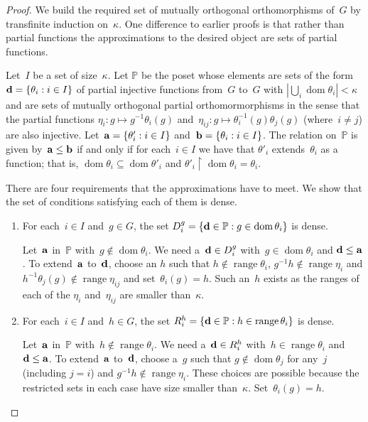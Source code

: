 \documentclass[12pt,a4paper]{article}
\DeclareMathOperator{\dom}{dom}
\DeclareMathOperator{\ran}{range}
\newcommand{\rest}{\mathbin{\upharpoonright}}
\renewcommand{\P}{\mathbb{P}}
\renewcommand{\a}{\textup{\textbf{a}}}
\renewcommand{\b}{\textup{\textbf{b}}}
\renewcommand{\d}{\textup{\textbf{d}}}
\begin{document}
\begin{proof}
We build the required set of mutually orthogonal orthomorphisms of~$G$ by transfinite induction on~$\kappa$.  One difference to earlier proofs is that rather than partial functions the approximations to the desired object are sets of partial functions.

Let~$I$ be a set of size~$\kappa$.  Let $\P$ be the poset whose elements are sets of the form~$\d=\{ \theta_i : i \in I \}$ of partial injective functions from~$G$ to~$G$ with $|\bigcup_{i} \dom \theta_i|  < \kappa$ and are sets of mutually orthogonal partial orthomormorphisms in the sense that the partial functions $\eta_i: g \mapsto g^{-1}\theta_i(g)$ and~$\eta_{ij}: g \mapsto \theta_i^{-1}(g)\theta_j(g)$ (where~$i \neq j$) are also injective.  Let~$\a = \{ \theta'_i : i \in I \}$ and~$\b = \{ \theta_i : i \in I \}$.
The relation on~$\P$ is given by~$\a \leq \b$ if and only if for each~$i \in I$ we have that $\theta'_i$ extends~$\theta_i$ as a function;  that is,  $\dom \theta_i \subseteq \dom \theta'_i$ and $\theta'_i \rest \dom \theta_i = \theta_i$.


There are four requirements that the approximations have to meet.  We show that the set of conditions satisfying each of them is dense.

\begin{enumerate}

\item For each~$i \in I$ and~$g \in G$, the set $D_i^g = \{ {\bf d} \in \P : g \in \dom \theta_i \}$ is dense.

Let~${\bf a}$ in~$\P$ with~$g \not\in \dom \theta_i$.  We need a~${\bf d} \in D_i^g$ with~$g \in \dom \theta_i$ and ${\bf d} \leq {\bf a}$.  To extend~${\bf a}$ to~${\bf d}$, choose an $h$ such that $h \not\in \ran \theta_i$, $g^{-1}h \not\in \ran \eta_i$ and $h^{-1}\theta_j(g) \not\in \ran \eta_{ij}$ and set~$\theta_i(g) = h$.  Such an~$h$ exists as the ranges of each of the $\eta_i$ and~$\eta_{ij}$ are smaller than~$\kappa$.


\item For each~$i \in I$ and~$h \in G$, the set $R_i^h = \{ {\bf d} \in \P : h \in \ran \theta_i \}$ is dense.

Let~${\bf a}$ in~$\P$ with~$h \not\in \ran \theta_i$.  We need a~${\bf d} \in R_i^h$ with~$h \in \ran \theta_i$ and ${\bf d} \leq {\bf a}$.  To extend~${\bf a}$ to~${\bf d}$, choose a~$g$ such that $g \not\in \dom \theta_j$ for any~$j$ (including $j=i$) and $g^{-1}h \not\in \ran \eta_i$.  These choices are possible because the restricted sets in each case have size smaller than~$\kappa$.
Set~$\theta_i(g) = h$.


\end{enumerate}
\end{proof}
\end{document}
